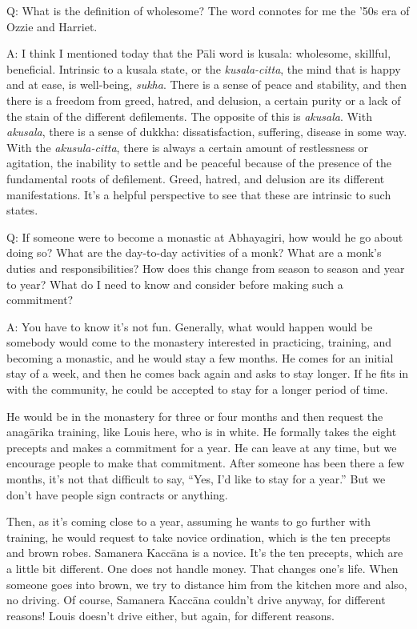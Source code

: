 \vspace{\the\qaskip}
Q: What is the definition of wholesome? The word connotes for me the
’50s era of Ozzie and Harriet.

\vspace{\the\qaskip}
A: I think I mentioned today that the Pāli word is kusala: wholesome,
skillful, beneficial. Intrinsic to a kusala state, or the
\emph{kusala-citta}, the mind that is happy and at ease, is well-being,
\emph{sukha}. There is a sense of peace and stability, and then there is
a freedom from greed, hatred, and delusion, a certain purity or a lack
of the stain of the different defilements. The opposite of this is
\emph{akusala}. With \emph{akusala}, there is a sense of dukkha:
dissatisfaction, suffering, disease in some way. With the
\emph{akusula-citta}, there is always a certain amount of restlessness
or agitation, the inability to settle and be peaceful because of the
presence of the fundamental roots of defilement. Greed, hatred, and
delusion are its different manifestations. It’s a helpful perspective to
see that these are intrinsic to such states.

\vspace{\the\qaskip}
Q: If someone were to become a monastic at Abhayagiri, how would he go
about doing so? What are the day-to-day activities of a monk? What are a
monk’s duties and responsibilities? How does this change from season to
season and year to year? What do I need to know and consider before
making such a commitment?

\vspace{\the\qaskip}
A: You have to know it’s not fun. Generally, what would happen would be
somebody would come to the monastery interested in practicing, training,
and becoming a monastic, and he would stay a few months. He comes for an
initial stay of a week, and then he comes back again and asks to stay
longer. If he fits in with the community, he could be accepted to stay
for a longer period of time.

He would be in the monastery for three or four months and then request
the anagārika training, like Louis here, who is in white. He formally
takes the eight precepts and makes a commitment for a year. He can leave
at any time, but we encourage people to make that commitment. After
someone has been there a few months, it’s not that difficult to say,
“Yes, I’d like to stay for a year.” But we don’t have people sign
contracts or anything.

Then, as it’s coming close to a year, assuming he wants to go further
with training, he would request to take novice ordination, which is the
ten precepts and brown robes. Samanera Kaccāna is a novice. It’s the ten
precepts, which are a little bit different. One does not handle money.
That changes one’s life. When someone goes into brown, we try to
distance him from the kitchen more and also, no driving. Of course,
Samanera Kaccāna couldn’t drive anyway, for different reasons! Louis
doesn’t drive either, but again, for different reasons.

